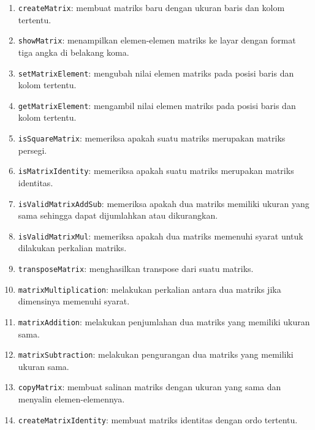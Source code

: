 \documentclass{article}
\begin{document}
\begin{enumerate}

    \item{\texttt{createMatrix}: membuat matriks baru dengan ukuran baris dan kolom tertentu.}

    \item{\texttt{showMatrix}: menampilkan elemen-elemen matriks ke layar dengan format tiga angka di belakang koma.}

    \item{\texttt{setMatrixElement}: mengubah nilai elemen matriks pada posisi baris dan kolom tertentu.}

    \item{\texttt{getMatrixElement}: mengambil nilai elemen matriks pada posisi baris dan kolom tertentu.}

    \item{\texttt{isSquareMatrix}: memeriksa apakah suatu matriks merupakan matriks persegi.}

    \item{\texttt{isMatrixIdentity}: memeriksa apakah suatu matriks merupakan matriks identitas.}

    \item{\texttt{isValidMatrixAddSub}: memeriksa apakah dua matriks memiliki ukuran yang sama sehingga dapat dijumlahkan atau dikurangkan.}

    \item{\texttt{isValidMatrixMul}: memeriksa apakah dua matriks memenuhi syarat untuk dilakukan perkalian matriks.}

    \item{\texttt{transposeMatrix}: menghasilkan transpose dari suatu matriks.}

    \item{\texttt{matrixMultiplication}: melakukan perkalian antara dua matriks jika dimensinya memenuhi syarat.}

    \item{\texttt{matrixAddition}: melakukan penjumlahan dua matriks yang memiliki ukuran sama.}

    \item{\texttt{matrixSubtraction}: melakukan pengurangan dua matriks yang memiliki ukuran sama.}

    \item{\texttt{copyMatrix}: membuat salinan matriks dengan ukuran yang sama dan menyalin elemen-elemennya.}

    \item{\texttt{createMatrixIdentity}: membuat matriks identitas dengan ordo tertentu.}


\end{enumerate}
\end{document}
